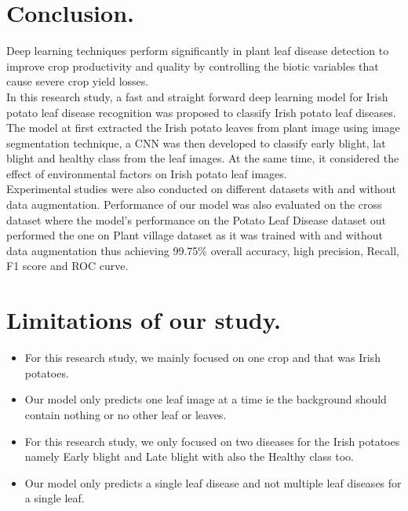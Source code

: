 \documentclass[11pt]{report}
\begin{document}
\section{Conclusion.}
Deep learning techniques perform significantly in plant leaf disease detection to improve crop productivity and quality by controlling the biotic variables that cause severe crop yield losses.\\

In this research study, a fast and straight forward deep learning model for Irish potato leaf disease recognition was proposed to classify Irish potato leaf diseases. The model at first extracted the Irish potato leaves from plant image using image segmentation technique, a CNN was then developed to classify early blight, lat blight and healthy class from the leaf images. At the same time, it considered the effect of environmental factors on Irish potato leaf images.\\

Experimental studies were also conducted on different datasets with and without data augmentation. Performance of our model was also evaluated on the cross dataset where the model's performance on the Potato Leaf Disease dataset out performed the one on Plant village dataset as it was trained with and without data augmentation thus achieving 99.75\% overall accuracy, high precision, Recall, F1 score and ROC curve.\\ 


\section{Limitations of our study.}
\begin{itemize}
	\item For this research study, we mainly focused on one crop and that was Irish potatoes.\\
	\item Our model only predicts one leaf image at a time ie the background should contain nothing or no other leaf or leaves.\\
	\item For this research study, we only focused on two diseases for the Irish potatoes namely Early blight and Late blight with also the Healthy class too.\\
	\item Our model only predicts a single leaf disease and not multiple leaf diseases for a single leaf.\\
\end{itemize}
\end{document}
